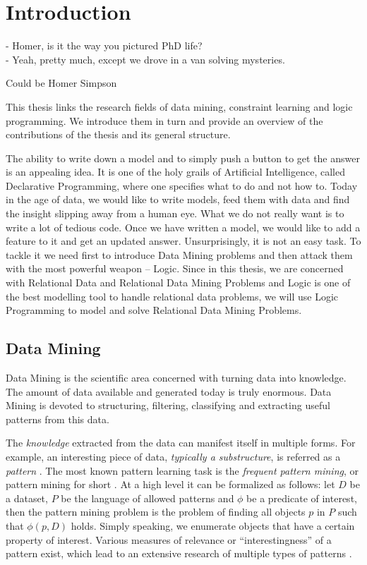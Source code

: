 \chapter{Introduction}\label{ch:introduction}
\epigraph{
- Homer, is it the way you pictured PhD life?\\
- Yeah, pretty much, except we drove in a van solving mysteries.
}{Could be Homer Simpson}

\begin{addmargin}[2em]{2em}
This thesis links the research fields of data mining, constraint learning
and logic programming. We introduce them in turn and provide an overview of the
contributions of the thesis and
its general structure.
\end{addmargin}

The ability to write down a model and to simply push a button to get the
answer is an appealing idea. It is one of the holy grails of
Artificial Intelligence, called Declarative Programming, where one
specifies what to do and not how to. Today in the age of data, we would like
to write models, feed them with data and find the insight slipping
away from a human eye. What we do not really want is to write
a lot of tedious code. Once we have written a model, we would like
to add a feature to it and get an updated answer. Unsurprisingly, it is
not an easy task. To tackle it we need first to introduce Data Mining
problems and then attack them with the most powerful weapon -- Logic.
Since in this thesis, we are
concerned with Relational Data and Relational Data Mining Problems 
and Logic is one of the best modelling tool to handle relational data
problems, we will use Logic Programming to model and solve Relational
Data Mining Problems.

\section{Data Mining}
Data Mining is the scientific area concerned with turning data into knowledge. 
The amount of data available and generated today is truly enormous. 
Data Mining is devoted to structuring, filtering, classifying and extracting useful patterns from this data.

The \textit{knowledge} extracted from the data can manifest itself in
multiple forms. For example, an interesting piece of data,
\textit{typically a substructure}, is referred as a \textit{pattern} \parencite{han_book}. 
The most known pattern learning task is the
\textit{frequent pattern mining}, or pattern mining for short \parencite{survey_han}. 
At a high level it can be formalized as follows: 
let $D$ be a dataset, $P$ be the language of allowed patterns and
$\phi$ be a predicate of
interest, then the pattern mining problem is the problem of finding
all objects $p$ in $P$ such that $\phi(p,D)$ holds.
Simply speaking, we enumerate objects that have a certain property of
interest.
Various measures of relevance or ``interestingness'' of a pattern exist, which lead to an extensive research of multiple types of patterns \parencite{tias_topk}.


